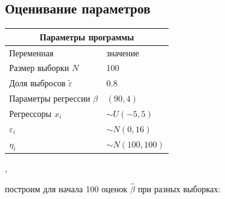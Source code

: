 \documentclass[a4paper,14pt]{extarticle}
\begin{document}
\subsection{Оценивание параметров}
\begin{center}
    \begin{tabular}{|p{5cm}|p{5cm}|}
        \hline
        \multicolumn{2}{|c|}{Параметры программы} \\
        \hline
        Переменная&значение\\
        \hline
        Размер выборки $N$& 100\\
        \hline
        Доля выбросов $\widetilde{\varepsilon}$& 0.8\\
        \hline
        Параметры регрессии $\beta$& $(90,4)$\\
        \hline
        Регрессоры $x_i$ & $\sim U(-5,5)$\\
        \hline
        $\varepsilon_i$&$\sim N(0,16)$\\
        \hline
        $\eta_i$&$\sim N(100,100)$\\
        \hline
    \end{tabular},
    \end{center}
построим для начала 100 оценок $\hat{\beta}$ при разных выборках:
\end{document}

